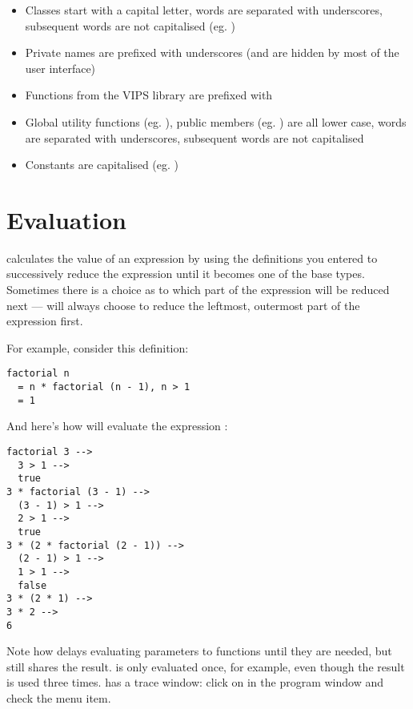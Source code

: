 \begin{itemize}

\item
Classes start with a capital letter, words are separated with underscores,
subsequent words are not capitalised (eg. )

\item
Private names are prefixed with underscores (and are hidden by most of the
user interface)

\item
Functions from the VIPS library are prefixed with 

\item
Global utility functions (eg. ), public members (eg.
) are all lower case, words are separated
with underscores, subsequent words are not capitalised

\item
Constants are capitalised (eg. )

\end{itemize}

\section{Evaluation}

\nip{} calculates the value of an expression by using the definitions you
entered to successively reduce the expression until it becomes one of the
base types. Sometimes there is a choice as to which part of the expression
will be reduced next --- \nip{} will always choose to reduce the leftmost,
outermost part of the expression first.

For example, consider this definition:

\begin{verbatim}
factorial n
  = n * factorial (n - 1), n > 1
  = 1
\end{verbatim}

And here's how \nip{} will evaluate the expression :

\begin{verbatim}
factorial 3 -->
  3 > 1 -->
  true
3 * factorial (3 - 1) -->
  (3 - 1) > 1 -->
  2 > 1 -->
  true
3 * (2 * factorial (2 - 1)) -->
  (2 - 1) > 1 -->
  1 > 1 -->
  false
3 * (2 * 1) -->
3 * 2 -->
6
\end{verbatim}

\noindent
Note how \nip{} delays evaluating parameters to functions until they are
needed, but still shares the result.  is only evaluated once,
for example, even though the result is used three times.  \nip{} has a trace
window: click on  in the program window and check the
 menu item.

